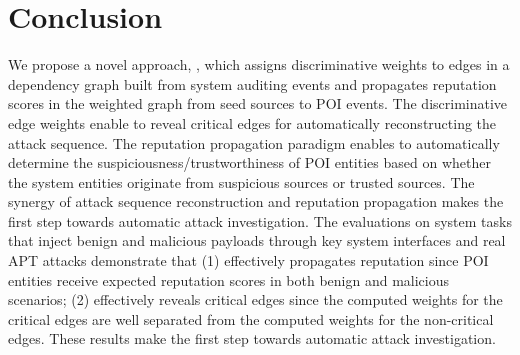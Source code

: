 \section{Conclusion}
We propose a novel approach, \tool, which assigns discriminative weights to edges in a dependency graph 
built from system auditing events
and propagates reputation scores in the weighted graph from seed sources to POI events.
The discriminative edge weights enable \tool to reveal critical edges for automatically reconstructing the attack sequence.
The reputation propagation paradigm enables \tool to automatically determine the suspiciousness/trustworthiness of POI entities based on whether the system entities originate from suspicious sources or trusted sources.
The synergy of attack sequence reconstruction and reputation propagation makes \tool the first step towards automatic attack investigation. 
The evaluations on system tasks that inject benign and malicious payloads through key system interfaces and real APT attacks demonstrate that 
(1) \tool effectively propagates reputation since POI entities receive expected reputation scores in both benign and malicious scenarios;
(2) \tool effectively reveals critical edges since the computed weights for the critical edges are well separated from the computed weights for the non-critical edges.
These results make \tool the first step towards automatic attack investigation.